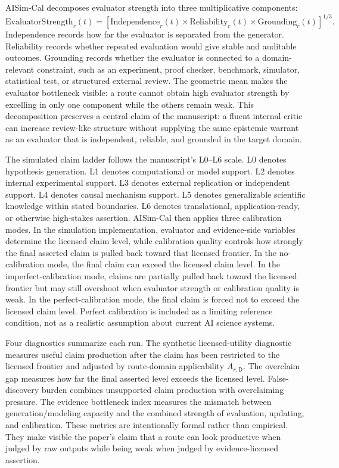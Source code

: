 \documentclass[11pt,a4paper]{article}
\newcommand{\Dom}{\mathsf{D}}
\begin{document}
AISim-Cal decomposes evaluator strength into three multiplicative components:
\begin{equation}
\mathrm{EvaluatorStrength}_r(t)=
\left[
\mathrm{Independence}_r(t)\times
\mathrm{Reliability}_r(t)\times
\mathrm{Grounding}_r(t)
\right]^{1/3}.
\end{equation}
Independence records how far the evaluator is separated from the generator. Reliability records whether repeated evaluation would give stable and auditable outcomes. Grounding records whether the evaluator is connected to a domain-relevant constraint, such as an experiment, proof checker, benchmark, simulator, statistical test, or structured external review. The geometric mean makes the evaluator bottleneck visible: a route cannot obtain high evaluator strength by excelling in only one component while the others remain weak. This decomposition preserves a central claim of the manuscript: a fluent internal critic can increase review-like structure without supplying the same epistemic warrant as an evaluator that is independent, reliable, and grounded in the target domain.

The simulated claim ladder follows the manuscript's L0--L6 scale. L0 denotes hypothesis generation. L1 denotes computational or model support. L2 denotes internal experimental support. L3 denotes external replication or independent support. L4 denotes causal mechanism support. L5 denotes generalizable scientific knowledge within stated boundaries. L6 denotes translational, application-ready, or otherwise high-stakes assertion. AISim-Cal then applies three calibration modes. In the simulation implementation, evaluator and evidence-side variables determine the licensed claim level, while calibration quality controls how strongly the final asserted claim is pulled back toward that licensed frontier. In the no-calibration mode, the final claim can exceed the licensed claim level. In the imperfect-calibration mode, claims are partially pulled back toward the licensed frontier but may still overshoot when evaluator strength or calibration quality is weak. In the perfect-calibration mode, the final claim is forced not to exceed the licensed claim level. Perfect calibration is included as a limiting reference condition, not as a realistic assumption about current AI science systems.

Four diagnostics summarize each run. The synthetic licensed-utility diagnostic measures useful claim production after the claim has been restricted to the licensed frontier and adjusted by route-domain applicability $A_{r,\Dom}$. The overclaim gap measures how far the final asserted level exceeds the licensed level. False-discovery burden combines unsupported claim production with overclaiming pressure. The evidence bottleneck index measures the mismatch between generation/modeling capacity and the combined strength of evaluation, updating, and calibration. These metrics are intentionally formal rather than empirical. They make visible the paper's claim that a route can look productive when judged by raw outputs while being weak when judged by evidence-licensed assertion.
\end{document}
